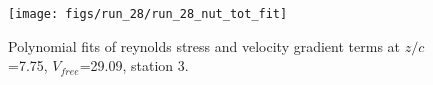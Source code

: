 \begin{figure}[H]
\centering
\texttt{[image: figs/run\_28/run\_28\_nut\_tot\_fit]}
\caption{Polynomial fits of reynolds stress and velocity gradient terms at $z/c$=7.75, $V_{free}$=29.09, station 3.}
\label{fig:run_28_nut_tot_fit}
\end{figure}


